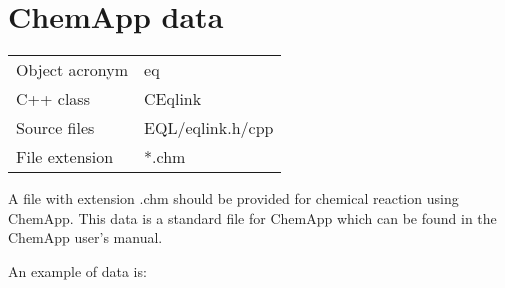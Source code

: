 \section{ChemApp data}

\begin{tabular*}{6.35cm}{|p{2.5cm}|p{3cm}|} \hline
Object acronym & eq \\
C++ class  & CEqlink \\
Source files   & EQL/eqlink.h/cpp \\
\hline
File extension & *.chm\\
\hline
\end{tabular*}


A file with extension .chm should be provided for chemical
reaction using ChemApp. This data is a standard file for ChemApp
which can be found in the ChemApp user's manual.

An example of data is:

